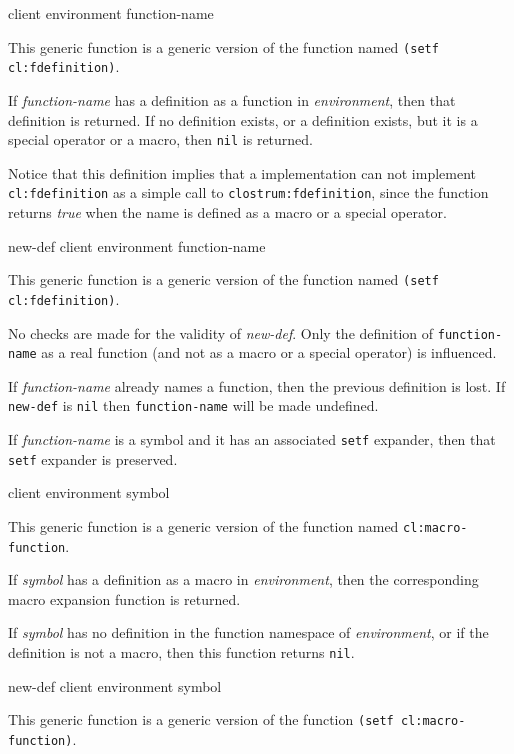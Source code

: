  {client environment function-name}

This generic function is a generic version of the \commonlisp{}
function named \texttt{(setf cl:fdefinition)}.

If \textit{function-name} has a definition as a function in
\textit{environment}, then that definition is returned.  If no
definition exists, or a definition exists, but it is a special
operator or a macro, then \texttt{nil} is returned.

Notice that this definition implies that a \commonlisp{}
implementation can not implement \texttt{cl:fdefinition} as a simple call
to \texttt{clostrum:fdefinition}, since the \commonlisp{} function
returns \textit{true} when the name is defined as a macro or a special
operator.

 {new-def client environment function-name}

This generic function is a generic version of the \commonlisp{}
function named \texttt{(setf cl:fdefinition)}.

No checks are made for the validity of \textit{new-def}.  Only the
definition of \texttt{function-name} as a real function (and not as a
macro or a special operator) is influenced.

If \textit{function-name} already names a function, then the previous
definition is lost.  If \texttt{new-def} is \texttt{nil} then
\texttt{function-name} will be made undefined.

If \textit{function-name} is a symbol and it has an associated
\texttt{setf} expander, then that \texttt{setf} expander is preserved.

 {client environment symbol}

This generic function is a generic version of the \commonlisp{}
function named \texttt{cl:macro-function}.

If \textit{symbol} has a definition as a macro in
\textit{environment}, then the corresponding macro expansion function
is returned.

If \textit{symbol} has no definition in the function namespace of
\textit{environment}, or if the definition is not a macro, then this
function returns \texttt{nil}.

 {new-def client environment symbol}

This generic function is a generic version of the \commonlisp{}
function \texttt{(setf cl:macro-function)}.

